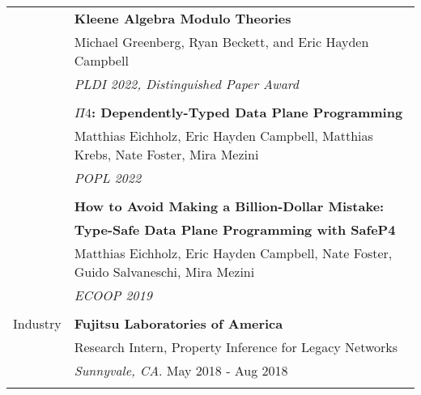 \documentclass[letterpaper,10pt,oneside]{article}
\begin{document}
\begin{tabular}{@{} l l}
  & \textbf{Kleene Algebra Modulo Theories} \\
  & Michael Greenberg, Ryan Beckett, and Eric Hayden Campbell \\
  & \textit{PLDI 2022, Distinguished Paper Award} \\
  &\\

  & \textbf{$\Pi4$: Dependently-Typed Data Plane Programming} \\
  & Matthias Eichholz, Eric Hayden Campbell, Matthias Krebs, Nate Foster, Mira Mezini \\
  & \textit{POPL 2022}\\ & \\

  & \textbf{How to Avoid Making a Billion-Dollar Mistake:}\\
  & \textbf{Type-Safe Data Plane Programming with SafeP4} \\
  & Matthias Eichholz, Eric Hayden Campbell, Nate Foster, Guido Salvaneschi, Mira Mezini \\
  & \textit{ECOOP 2019} \\
  & \\

 \Large{Industry}
  & \textbf{Fujitsu Laboratories of America} \\
  & Research Intern, Property Inference for Legacy Networks \\
  & \textit{Sunnyvale, CA}. May 2018 - Aug 2018 \\
  & \\

\end{tabular}
\end{document}
